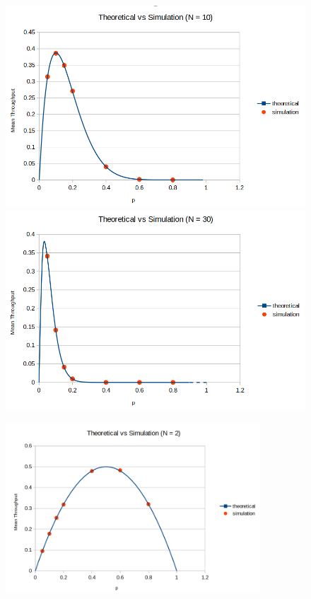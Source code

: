\begin{figure}[H]
	\begin{minipage}[b]{0.55\textwidth}
		\includegraphics[width=\textwidth]{img/SecondVerificationN10.png}
	\end{minipage}
	\begin{minipage}[b]{0.55\textwidth}
		\includegraphics[width=\textwidth]{img/SecondVerificationN30.png}
	\end{minipage}
\end{figure}
\begin{figure}[H]
	\centering
	\includegraphics[width=0.85\textwidth]{img/SecondVerificationN2.png}
\end{figure}
